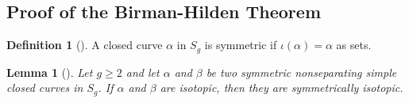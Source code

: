 \documentclass[reqno]{amsart}
\newtheorem{lemma}[theorem]{Lemma}
\theoremstyle{definition}
\newtheorem{definition}[theorem]{Definition}
\theoremstyle{remark}
\begin{document}
   \subsection{Proof of the Birman-Hilden Theorem}

   \begin{definition}[]
       A closed curve $\alpha$ in $S_g$ is symmetric
       if $\iota \left( \alpha \right) = \alpha$ as sets.
   \end{definition}

   \begin{lemma}[]\label{loops-isotopic-iff-symmetrically-isotopic}
       Let $g \ge 2$ and let $\alpha$ and $\beta$ be
       two symmetric nonseparating simple closed
       curves in $S_g$. If $\alpha$ and $\beta$ are isotopic,
       then they are symmetrically isotopic.
   \end{lemma}
\end{document}
